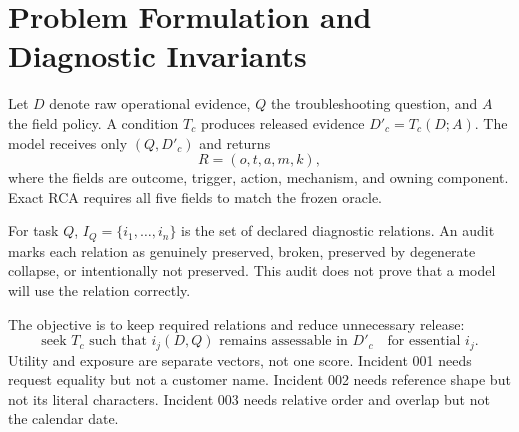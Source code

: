 \section{Problem Formulation and Diagnostic Invariants}
\label{sec:formulation}
Let $D$ denote raw operational evidence, $Q$ the troubleshooting question,
and $A$ the field policy. A condition $T_c$ produces released evidence
$D'_c=T_c(D;A)$. The model receives only $(Q,D'_c)$ and returns
\[
R=(o,t,a,m,k),
\]
where the fields are outcome, trigger, action, mechanism, and owning
component. Exact RCA requires all five fields to match the frozen oracle.

For task $Q$, $I_Q=\{i_1,\ldots,i_n\}$ is the set of declared diagnostic
relations. An audit marks each relation as genuinely preserved, broken,
preserved by degenerate collapse, or intentionally not preserved. This audit
does not prove that a model will use the relation correctly.

The objective is to keep required relations and reduce unnecessary release:
\[
\text{seek }T_c\text{ such that }i_j(D,Q)\text{ remains assessable in }D'_c
\quad\text{for essential }i_j.
\]
Utility and exposure are separate vectors, not one score. Incident 001 needs
request equality but not a customer name. Incident 002 needs reference shape
but not its literal characters. Incident 003 needs relative order and overlap
but not the calendar date.
